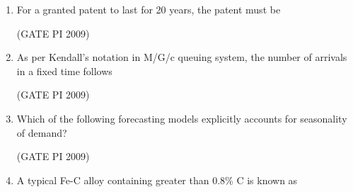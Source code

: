 \documentclass[journal,12pt,onecolumn]{IEEEtran}
\theoremstyle{remark}
\begin{document}
\begin{enumerate}[label=Q.\arabic*]
(a) $h^2$ \hfill (b) $h^3$ \hfill(c) $h^4$ \hfill (d) $h^5$ 

\hfill (GATE PI 2009)
\item For a granted patent to last for 20 years, the patent must be
\begin{enumerate}
\end{enumerate}

\hfill (GATE PI 2009)
\item As per Kendall's notation in M/G/c queuing system, the number of arrivals in a fixed time follows
\begin{enumerate}
\end{enumerate}
\hfill (GATE PI 2009)
\item Which of the following forecasting models explicitly accounts for seasonality of demand?
\begin{enumerate}
\end{enumerate}
\hfill (GATE PI 2009)
\item A typical Fe-C alloy containing greater than 0.8\% C is known as
\begin{enumerate}
\end{enumerate}
\end{enumerate}
\end{document}
